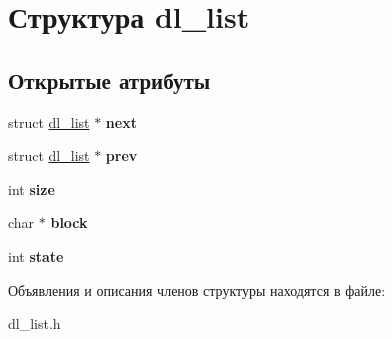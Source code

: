 \hypertarget{structdl__list}{}\section{Структура dl\+\_\+list}
\label{structdl__list}
\subsection*{Открытые атрибуты}
\begin{DoxyCompactItemize}
\item 
\mbox{\label{structdl__list_ac79fda13622c575daa1596a8434b270d}} 
struct \mbox{\hyperlink{structdl__list}{dl\+\_\+list}} $\ast$ {\bfseries next}
\item 
\mbox{\label{structdl__list_afca3d6ddb75c1892430ea0000fa419e9}} 
struct \mbox{\hyperlink{structdl__list}{dl\+\_\+list}} $\ast$ {\bfseries prev}
\item 
\mbox{\label{structdl__list_a8c50269c26b5a85f5f96f187bfe9a4e0}} 
int {\bfseries size}
\item 
\mbox{\label{structdl__list_ab17cb8c9991c5e3e592d4ed15c17a32e}} 
char $\ast$ {\bfseries block}
\item 
\mbox{\label{structdl__list_a6bd57a6c32da90ab5c810e25a94061cb}} 
int {\bfseries state}
\end{DoxyCompactItemize}


Объявления и описания членов структуры находятся в файле\+:\begin{DoxyCompactItemize}
\item 
dl\+\_\+list.\+h\end{DoxyCompactItemize}
